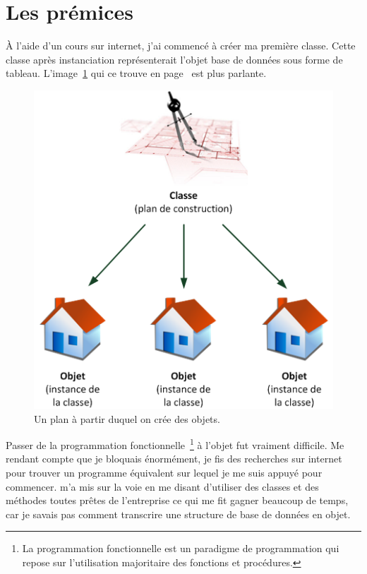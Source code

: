 \section{Les prémices} %
\label{sec:Les prémices}

À l'aide d'un cours sur internet, j'ai commencé à créer ma première classe.
Cette classe après instanciation représenterait l'objet \og base de données
\fg{} sous forme de tableau. L'image~\ref{obj} qui ce trouve en
page~\pageref{obj} est plus parlante.

\begin{figure}
\begin{center}
\includegraphics[scale=0.7]{images/objet.png}
\end{center}
\caption{Un plan à partir duquel on crée des objets.}
\label{obj}
\end{figure}

Passer de la programmation fonctionnelle\, \footnote{La programmation
fonctionnelle est un paradigme de programmation qui repose sur l'utilisation
majoritaire des fonctions et procédures.} à l'objet fut vraiment difficile. Me
rendant compte que je bloquais énormément, je fis des recherches sur internet
pour trouver un programme équivalent sur lequel je me suis appuyé pour
commencer.  m'a mis sur la voie en me disant d'utiliser des
classes et des méthodes toutes prêtes de l'entreprise ce qui me fit gagner
beaucoup de temps, car je savais pas comment transcrire une structure de base
de données en objet.

